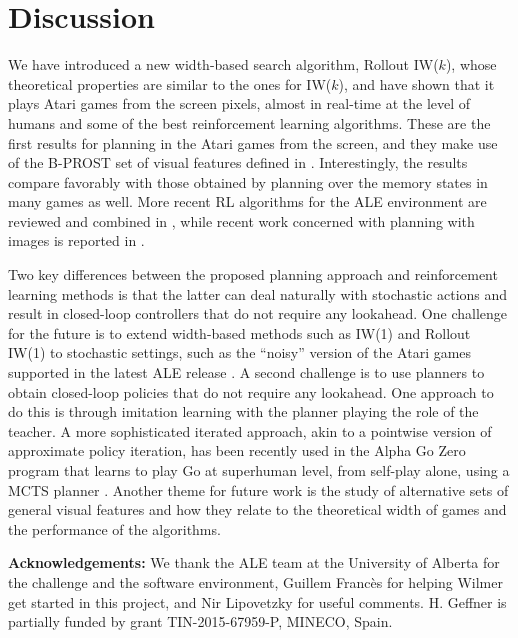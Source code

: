 \documentclass[letterpaper]{article}
\begin{document}
\section{Discussion}

We have introduced a new width-based search algorithm, Rollout IW($k$), whose
theoretical properties are similar to the ones for IW($k$), and have shown that
it plays Atari games from the screen pixels, almost in real-time at the level
of humans and some of the best reinforcement learning algorithms.
These are the first results for planning in the Atari games from the screen, and
they make use of the B-PROST set of visual features defined in \cite{shallow}.
Interestingly, the results compare favorably with those obtained by planning over
the memory states in many games as well. More recent RL algorithms for the ALE
environment are reviewed and combined in \cite{silver:rainbow}, while recent work
concerned with planning with images is reported in \cite{fukunaga:planning-images}.



Two key differences between the proposed planning approach and reinforcement learning
methods is that the latter can deal naturally with stochastic actions and result in
closed-loop controllers that do not require any lookahead.
One challenge for the future is to extend width-based methods such as IW(1) and Rollout IW(1)
to stochastic settings, such as the ``noisy'' version of the Atari games supported in the
latest ALE release \cite{machado:ale}. A second challenge is to use planners to
obtain closed-loop policies that do not require any lookahead. One approach to do this 
is through imitation learning with the planner playing the role of the teacher. 
A more sophisticated iterated approach, akin to a pointwise version of approximate policy iteration, 
has been recently used in the Alpha Go Zero program that learns to play Go at superhuman level,
from self-play alone, using a MCTS planner \cite{alpha-zero-go}.
Another theme for future work is the study of alternative sets of general visual
features and how they relate to the theoretical width of games and the performance
of the algorithms. 


\medskip
\noindent\textbf{Acknowledgements:}
We thank the ALE team at the University of Alberta for the challenge and the software environment,
Guillem Franc\`es for helping Wilmer get started in this project, and
Nir Lipovetzky for useful comments.
H. Geffner is partially funded by grant TIN-2015-67959-P, MINECO, Spain.




\end{document}

